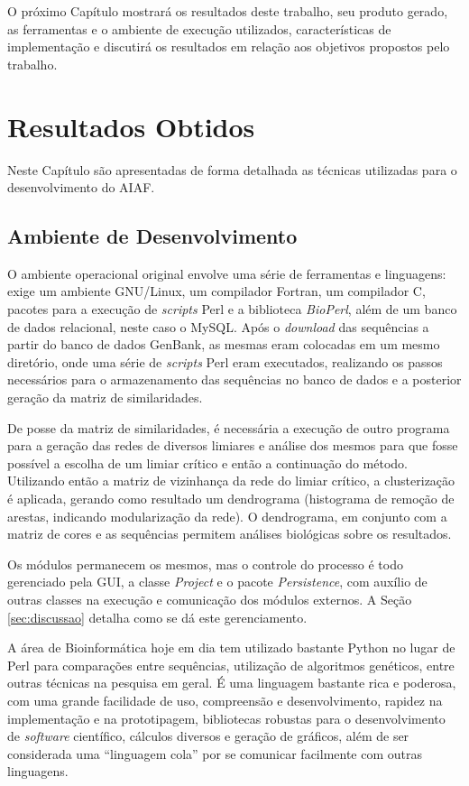 O próximo Capítulo mostrará os resultados deste trabalho, seu produto gerado, as ferramentas e o ambiente de execução utilizados, características
de implementação e discutirá os resultados em relação aos objetivos propostos pelo trabalho.

\chapter{Resultados Obtidos}
\label{cap:resultados}

Neste Capítulo são apresentadas de forma detalhada as técnicas utilizadas para o desenvolvimento do AIAF.


\section{Ambiente de Desenvolvimento} \label{sec:ambiente}

O ambiente operacional original
envolve uma série de ferramentas e linguagens: exige um ambiente GNU/Linux, um compilador Fortran, um compilador C, pacotes para
a execução de \textit{scripts} Perl e a biblioteca \textit{BioPerl}, além de um banco de dados relacional, neste caso o MySQL. Após o \textit{download} das
sequências a partir do banco de dados GenBank, as mesmas eram colocadas em um mesmo diretório, onde uma série de \textit{scripts} Perl eram executados,
realizando os passos necessários para o armazenamento das sequências no banco de dados e a posterior geração da matriz de similaridades.

De posse da matriz de similaridades, é necessária a execução de outro programa para a geração das redes de diversos limiares e análise dos mesmos para que
fosse possível a escolha de um limiar crítico e então a continuação do método.
Utilizando então a matriz de vizinhança da rede do limiar crítico, a clusterização é aplicada, gerando como
resultado um dendrograma (histograma de remoção de arestas, indicando modularização da rede). O dendrograma, em conjunto com a matriz de cores e as sequências
permitem análises biológicas sobre os resultados.

Os módulos permanecem os mesmos, mas o controle do processo é todo gerenciado pela GUI, a classe \textit{Project} e o pacote \textit{Persistence},
com auxílio de
outras classes na execução e comunicação dos módulos externos. A Seção \ref{sec:discussao} detalha como se dá este gerenciamento.

A área de Bioinformática hoje em dia tem utilizado bastante Python \cite{python} no lugar de Perl para comparações entre sequências, utilização de algoritmos
genéticos, entre outras técnicas na pesquisa em geral. É uma linguagem bastante rica e poderosa, com uma grande facilidade de uso, compreensão e
desenvolvimento, rapidez na implementação e na prototipagem, bibliotecas robustas para o desenvolvimento de \textit{software} científico, cálculos
diversos e geração de gráficos, além de ser considerada uma ``linguagem cola'' por se comunicar facilmente com outras linguagens.

